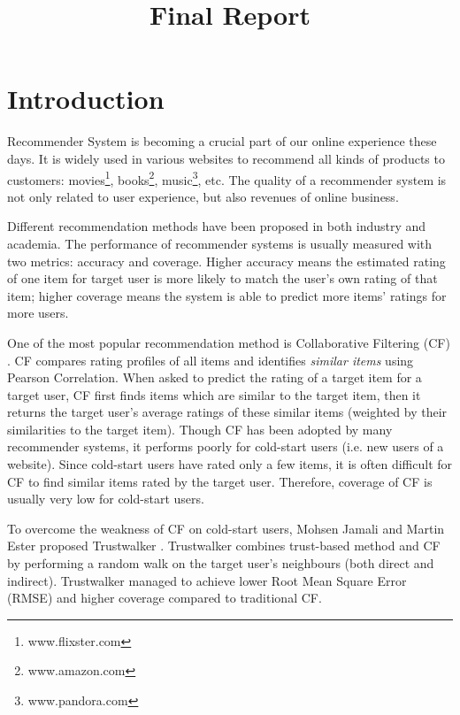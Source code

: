 \documentclass[12pt]{article}
\title{Final Report}
\author{}
\begin{document}
\maketitle

\section{Introduction}
Recommender System is becoming a crucial part of our online experience these days. It is widely used in various websites to recommend all kinds of products to customers: movies\footnote[1]{www.flixster.com}, books\footnote[2]{www.amazon.com}, music\footnote[3]{www.pandora.com}, etc. The quality of a recommender system is not only related to user experience, but also revenues of online business.  

Different recommendation methods have been proposed in both industry and academia. The performance of recommender systems is usually measured with two metrics: accuracy and coverage. Higher accuracy means the estimated rating of one item for target user is more likely to match the user's own rating of that item; higher coverage means the system is able to predict more items' ratings for more users. 

One of the most popular recommendation method is Collaborative Filtering (CF) \cite{Sarwar:2001p125}. CF compares rating profiles of all items and identifies \emph{similar items} using Pearson Correlation. When asked to predict the rating of a target item for a target user, CF first finds items which are similar to the target item, then it returns the target user's average ratings of these similar items (weighted by their similarities to the target item). Though CF has been adopted by many recommender systems, it performs poorly for cold-start users (i.e. new users of a website). Since cold-start users have rated only a few items, it is often difficult for CF to find similar items rated by the target user. Therefore, coverage of CF is usually very low for cold-start users. 

To overcome the weakness of CF on cold-start users, Mohsen Jamali and Martin Ester proposed Trustwalker \cite{Jamali:2009p67}. Trustwalker combines trust-based method and CF by performing a random walk on the target user's neighbours (both direct and indirect). Trustwalker managed to achieve lower Root Mean Square Error (RMSE) and higher coverage compared to traditional CF. 
\end{document}
